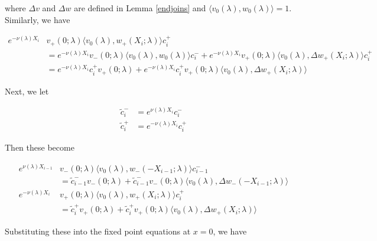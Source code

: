 \documentclass[12pt]{article}
\begin{document}
where $\Delta v$ and $\Delta w$ are defined in Lemma \ref{endjoins} and $\langle v_0(\lambda), w_0(\lambda) \rangle = 1$. Similarly, we have

\begin{align*}
e^{-\nu(\lambda)X_i} &v_+(0; \lambda) \langle v_0(\lambda), w_+(X_i; \lambda) \rangle c_i^+ \\
&= e^{-\nu(\lambda)X_i} v_-(0; \lambda) \langle v_0(\lambda), w_0(\lambda) \rangle c_i^- + e^{-\nu(\lambda)X_i} v_+(0; \lambda) \langle v_0(\lambda), \Delta w_+(X_i; \lambda) \rangle c_i^+ \\
&= e^{-\nu(\lambda)X_i} c_i^+ v_+(0; \lambda) + e^{-\nu(\lambda)X_i} c_i^+ v_+(0; \lambda) \langle v_0(\lambda), \Delta w_+(X_i; \lambda) \rangle 
\end{align*}

Next, we let

\begin{align*}
\tilde{c}_i^- &= e^{\nu(\lambda)X_i} c_i^- \\
\tilde{c}_i^+ &= e^{-\nu(\lambda)X_i} c_i^+
\end{align*}

Then these become

\begin{align*}
e^{\nu(\lambda)X_{i-1}} &v_-(0; \lambda) \langle v_0(\lambda), w_-(-X_{i-1}; \lambda) \rangle c_{i-1}^- \\
&= \tilde{c}_{i-1}^- v_-(0; \lambda) + \tilde{c}_{i-1}^- v_-(0; \lambda) \langle v_0(\lambda), \Delta w_-(-X_{i-1}; \lambda) \rangle \\
e^{-\nu(\lambda)X_i} &v_+(0; \lambda) \langle v_0(\lambda), w_+(X_i; \lambda) \rangle c_i^+ \\
&= \tilde{c}_i^+ v_+(0; \lambda) + \tilde{c}_i^+ v_+(0; \lambda) \langle v_0(\lambda), \Delta w_+(X_i; \lambda) \rangle 
\end{align*}

Substituting these into the fixed point equations at $x = 0$, we have
\end{document}
